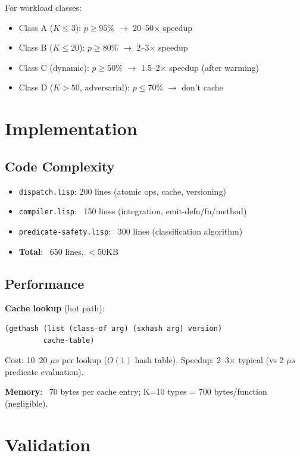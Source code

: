 \documentclass[sigplan,review,anonymous]{acmart}
\begin{document}
\begin{theorem}
For workload classes:
\begin{itemize}
\item Class A ($K \leq 3$): $p \geq 95\%$ $\rightarrow$ 20--50$\times$ speedup
\item Class B ($K \leq 20$): $p \geq 80\%$ $\rightarrow$ 2--3$\times$ speedup
\item Class C (dynamic): $p \geq 50\%$ $\rightarrow$ 1.5--2$\times$ speedup (after warming)
\item Class D ($K > 50$, adversarial): $p \leq 70\%$ $\rightarrow$ don't cache
\end{itemize}
\end{theorem}

\section{Implementation}

\subsection{Code Complexity}

\begin{itemize}
\item \texttt{dispatch.lisp}: 200 lines (atomic ops, cache, versioning)
\item \texttt{compiler.lisp}: ~150 lines (integration, emit-defn/fn/method)
\item \texttt{predicate-safety.lisp}: ~300 lines (classification algorithm)
\item \textbf{Total}: ~650 lines, $<$50KB
\end{itemize}

\subsection{Performance}

\textbf{Cache lookup} (hot path):
\begin{lstlisting}
(gethash (list (class-of arg) (sxhash arg) version)
         cache-table)
\end{lstlisting}

Cost: 10--20 $\mu s$ per lookup ($O(1)$ hash table).
Speedup: 2--3$\times$ typical (vs 2 $\mu s$ predicate evaluation).

\textbf{Memory}: ~70 bytes per cache entry; K=10 types = 700 bytes/function (negligible).

\section{Validation}
\end{document}
